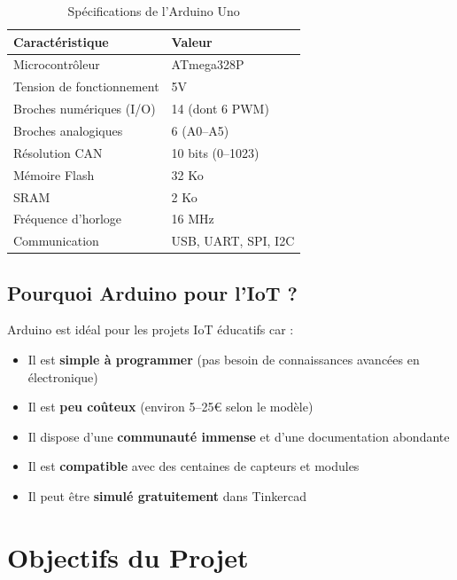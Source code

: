\documentclass[12pt, a4paper]{article}
\begin{document}
\begin{table}[H]
    \centering
    \caption{Spécifications de l'Arduino Uno}
    \begin{tabular}{ll}
        \toprule
        \textbf{Caractéristique} & \textbf{Valeur} \\
        \midrule
        Microcontrôleur & ATmega328P \\
        Tension de fonctionnement & 5V \\
        Broches numériques (I/O) & 14 (dont 6 PWM) \\
        Broches analogiques & 6 (A0–A5) \\
        Résolution CAN & 10 bits (0–1023) \\
        Mémoire Flash & 32 Ko \\
        SRAM & 2 Ko \\
        Fréquence d'horloge & 16 MHz \\
        Communication & USB, UART, SPI, I2C \\
        \bottomrule
    \end{tabular}
\end{table}

\subsection{Pourquoi Arduino pour l'IoT ?}

Arduino est idéal pour les projets IoT éducatifs car :
\begin{itemize}
    \item Il est \textbf{simple à programmer} (pas besoin de connaissances avancées en électronique)
    \item Il est \textbf{peu coûteux} (environ 5--25€ selon le modèle)
    \item Il dispose d'une \textbf{communauté immense} et d'une documentation abondante
    \item Il est \textbf{compatible} avec des centaines de capteurs et modules
    \item Il peut être \textbf{simulé gratuitement} dans Tinkercad
\end{itemize}

\section{Objectifs du Projet}
\end{document}
